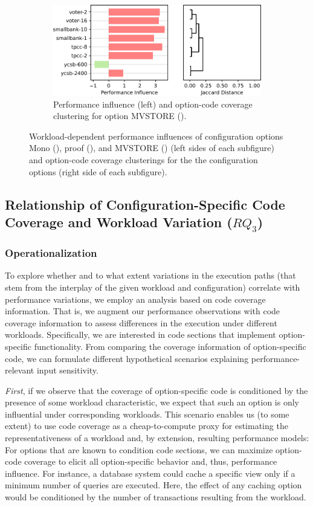 {{\begin{figure}
	\begin{subfigure}{\linewidth}
		\centering
		\vspace{2em}
		\includegraphics[width=0.99\linewidth]{rq23/MVSTORE.pdf}
		\caption{Performance influence (left) and option-code coverage clustering for option \textsf{MVSTORE} (\htwo).}
		\label{fig:mvstore_h2}
	\end{subfigure}
\caption{Workload-dependent performance influences of configuration options \textsf{Mono} (\jumper), \textsf{proof} (\zdrei), and \textsf{MVSTORE} (\htwo) (left sides of each subfigure) and option-code coverage clusterings for the the configuration options (right side of each subfigure).}
\end{figure}

\subsection{Relationship of Configuration-Specific Code Coverage and Workload Variation ($RQ_3$)}\label{sec:rq3}\label{sec:categories}
\subsubsection{Operationalization}To explore whether and to what extent variations in the execution paths (that stem from the interplay of the given workload and configuration) correlate with performance variations, we employ an analysis based on code coverage information. That is, we augment our performance observations with code coverage information to assess differences in the execution under different workloads. Specifically, we are interested in code sections that implement option-specific functionality. From comparing the coverage information of option-specific code, we can formulate different hypothetical scenarios explaining performance-relevant input sensitivity. 

\textit{First}, if we observe that the  coverage of option-specific code is conditioned by the presence of some workload characteristic, we expect that such an option is only influential under corresponding workloads. This scenario enables us (to some extent) to use code coverage as a cheap-to-compute proxy for estimating the representativeness of a workload and, by extension, resulting performance models: For options that are known to condition code sections, we can maximize option-code coverage to elicit all option-specific behavior and, thus, performance influence. For instance, a database system could cache a specific view only if a minimum number of queries are executed. Here, the effect of any caching option would be conditioned by the number of transactions resulting from the workload.

}}
